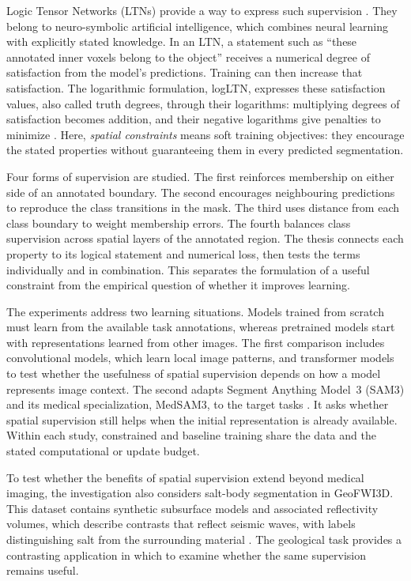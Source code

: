 \documentclass[12pt,a4paper]{article}
\begin{document}
Logic Tensor Networks (LTNs) provide a way to express such supervision
\cite{badreddine2022logic}. They belong to neuro-symbolic artificial
intelligence, which combines neural learning with explicitly stated
knowledge. In an LTN, a statement such as ``these annotated inner voxels
belong to the object'' receives a numerical degree of satisfaction from the
model's predictions. Training can then increase that satisfaction. The
logarithmic formulation, logLTN, expresses these satisfaction values, also
called truth degrees, through their logarithms: multiplying degrees of
satisfaction becomes addition, and their negative logarithms give penalties
to minimize \cite{badreddine2023logltn}. Here, \emph{spatial constraints}
means soft training objectives: they encourage the stated properties without
guaranteeing them in every predicted segmentation.

Four forms of supervision are studied. The first reinforces membership
on either side of an annotated boundary. The second encourages
neighbouring predictions to reproduce the class transitions in the mask.
The third uses distance from each class boundary to weight membership
errors. The fourth balances class supervision across spatial layers of
the annotated region. The thesis connects each property to its logical
statement and numerical loss, then tests the terms individually and in
combination. This separates the formulation of a useful constraint from
the empirical question of whether it improves learning.

The experiments address two learning situations. Models trained from scratch
must learn from the available task annotations, whereas pretrained models
start with representations learned from other images. The first comparison
includes convolutional models, which learn local image patterns, and
transformer models to test whether the usefulness of spatial supervision
depends on how a model represents image context. The second adapts Segment
Anything Model~3 (SAM3) and its medical specialization, MedSAM3, to the
target tasks \cite{carion2025sam3,liu2025medsam3}. It asks whether spatial
supervision still helps when the initial representation is already
available. Within each study, constrained and baseline training share the
data and the stated computational or update budget.

To test whether the benefits of spatial supervision extend beyond medical
imaging, the investigation also considers salt-body segmentation in
GeoFWI3D. This dataset contains synthetic subsurface models and associated
reflectivity volumes, which describe contrasts that reflect seismic waves,
with labels distinguishing salt from the surrounding material
\cite{swaminadhan2026geofwi3d}. The geological task provides a contrasting
application in which to examine whether the same supervision remains useful.
\end{document}
